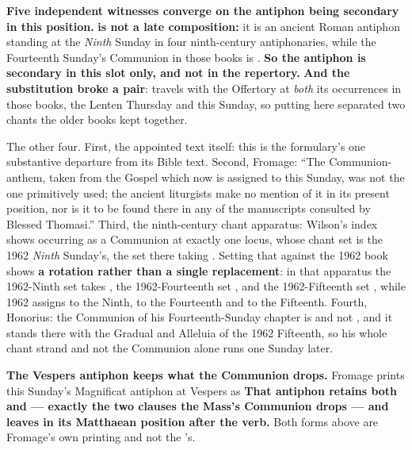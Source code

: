 \textbf{Five independent witnesses converge on the antiphon being secondary in
this position.}
\textbf{ is not a late composition:} it is an ancient
Roman antiphon standing at the \emph{Ninth} Sunday in four ninth-century
antiphonaries, while the Fourteenth Sunday's Communion in those books is
. \textbf{So the antiphon is secondary in this slot
only, and not in the repertory.} \textbf{And the substitution broke a pair}:
 travels with the Offertory  at \emph{both} its occurrences in those books, the Lenten Thursday and
this Sunday, so putting  here
separated two chants the older books kept together.

The other four. First, the appointed text itself: this is the formulary's one
substantive departure from its Bible text. Second, Fromage: ``The
Communion-anthem, taken from the Gospel which now is assigned to this Sunday,
was not the one primitively used; the ancient liturgists make no mention of it
in its present position, nor is it to be found there in any of the manuscripts
consulted by Blessed Thomasi.'' Third, the ninth-century chant apparatus:
Wilson's index shows  occurring as a Communion at exactly
one locus, whose chant set is the 1962 \emph{Ninth} Sunday's, the
 set there taking . Setting that
against the 1962 book shows \textbf{a rotation rather than a single
replacement}: in that apparatus the 1962-Ninth set takes , the 1962-Fourteenth set , and the
1962-Fifteenth set , while 1962 assigns 
to the Ninth,  to the Fourteenth and  to the Fifteenth. Fourth, Honorius: the Communion of his Fourteenth-Sunday
chapter is  and not , and it
stands there with the Gradual and Alleluia of the 1962 Fifteenth, so his whole
chant strand and not the Communion alone runs one Sunday later.

\textbf{The Vespers antiphon keeps what the Communion drops.}
Fromage prints this
Sunday's Magnificat antiphon at Vespers as  \textbf{That antiphon
retains both  and  --- exactly the two
clauses the Mass's Communion drops --- and leaves  in its Matthaean
position after the verb.} Both forms above are Fromage's own printing and not the
's.

